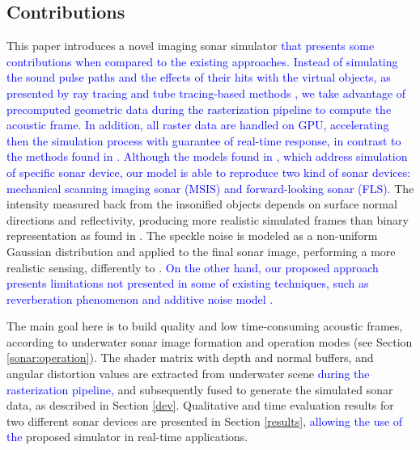\documentclass[final,5p,times]{elsarticle}
\begin{document}
\subsection{Contributions}

This paper introduces a novel imaging sonar simulator \textcolor{blue}{that presents some contributions when compared to the existing approaches. Instead of simulating the sound pulse paths and the effects of their hits with the virtual objects, as presented by ray tracing and tube tracing-based methods \cite{bell1997,coiras2009,gueriot2010,sac2015,demarco2015,gu2013,kwak2015},
we take advantage of precomputed geometric data during the rasterization
pipeline to compute the acoustic frame. In addition, all raster data are handled on GPU, accelerating then the simulation process with guarantee of
real-time response, in contrast to the methods found in
\cite{bell1997,coiras2009,sac2015,demarco2015}. Although the models found in \cite{bell1997,coiras2009,gueriot2010,sac2015,demarco2015,gu2013,kwak2015}, which address simulation of specific sonar device, our model is able to reproduce two kind of sonar devices: mechanical scanning imaging sonar (MSIS)
and forward-looking sonar (FLS).} The intensity measured back from the
insonified objects depends on surface normal directions and reflectivity,
producing more realistic simulated frames than binary representation as
found in \cite{gu2013,kwak2015}. The speckle noise is modeled as a non-uniform Gaussian distribution and applied to the final sonar image, performing a more realistic sensing, differently to \cite{gueriot2010,sac2015,demarco2015,gu2013,kwak2015}. \textcolor{blue}{On the other hand, our proposed approach presents limitations not presented in some of existing techniques, such as reverberation phenomenon \cite{sac2015} and additive noise model \cite{sac2015,demarco2015}.} %

The main goal here is to build quality and low time\hyp{}consuming acoustic frames, according to underwater sonar image formation and operation modes (see Section \ref{sonar:operation}). The shader matrix with depth and normal buffers, and angular distortion values are extracted from underwater scene \textcolor{blue}{during the rasterization pipeline,} and subsequently fused to generate the simulated sonar data, as described in Section \ref{dev}. Qualitative and time evaluation results for two different sonar devices are presented in Section \ref{results}, \textcolor{blue}{allowing the use of the} proposed simulator in real-time applications.
\end{document}
